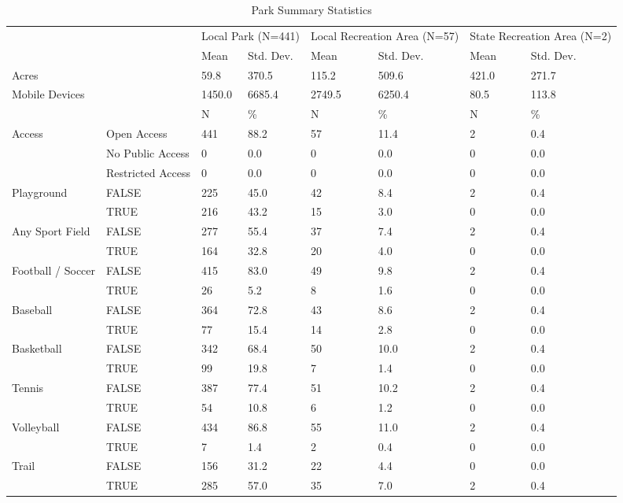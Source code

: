 \documentclass[]{elsarticle} %
\begin{document}
\begin{table}

\caption{\label{tab:park-attributes}Park Summary Statistics}
\centering
\begin{tabular}[t]{llllllll}
\toprule
\multicolumn{2}{c}{ } & \multicolumn{2}{c}{Local Park (N=441)} & \multicolumn{2}{c}{Local Recreation Area (N=57)} & \multicolumn{2}{c}{State Recreation Area (N=2)} \\
\cmidrule(l{3pt}r{3pt}){3-4} \cmidrule(l{3pt}r{3pt}){5-6} \cmidrule(l{3pt}r{3pt}){7-8}
  &    & Mean & Std. Dev. & Mean  & Std. Dev.  & Mean   & Std. Dev.  \\
\midrule
Acres &  & 59.8 & 370.5 & 115.2 & 509.6 & 421.0 & 271.7\\
Mobile Devices &  & 1450.0 & 6685.4 & 2749.5 & 6250.4 & 80.5 & 113.8\\
\midrule
 &  & N & \% & N & \% & N & \%\\
Access & Open Access & 441 & 88.2 & 57 & 11.4 & 2 & 0.4\\
 & No Public Access & 0 & 0.0 & 0 & 0.0 & 0 & 0.0\\
 & Restricted Access & 0 & 0.0 & 0 & 0.0 & 0 & 0.0\\
Playground & FALSE & 225 & 45.0 & 42 & 8.4 & 2 & 0.4\\
 & TRUE & 216 & 43.2 & 15 & 3.0 & 0 & 0.0\\
Any Sport Field & FALSE & 277 & 55.4 & 37 & 7.4 & 2 & 0.4\\
 & TRUE & 164 & 32.8 & 20 & 4.0 & 0 & 0.0\\
Football / Soccer & FALSE & 415 & 83.0 & 49 & 9.8 & 2 & 0.4\\
 & TRUE & 26 & 5.2 & 8 & 1.6 & 0 & 0.0\\
Baseball & FALSE & 364 & 72.8 & 43 & 8.6 & 2 & 0.4\\
 & TRUE & 77 & 15.4 & 14 & 2.8 & 0 & 0.0\\
Basketball & FALSE & 342 & 68.4 & 50 & 10.0 & 2 & 0.4\\
 & TRUE & 99 & 19.8 & 7 & 1.4 & 0 & 0.0\\
Tennis & FALSE & 387 & 77.4 & 51 & 10.2 & 2 & 0.4\\
 & TRUE & 54 & 10.8 & 6 & 1.2 & 0 & 0.0\\
Volleyball & FALSE & 434 & 86.8 & 55 & 11.0 & 2 & 0.4\\
 & TRUE & 7 & 1.4 & 2 & 0.4 & 0 & 0.0\\
Trail & FALSE & 156 & 31.2 & 22 & 4.4 & 0 & 0.0\\
 & TRUE & 285 & 57.0 & 35 & 7.0 & 2 & 0.4\\
\bottomrule
\end{tabular}
\end{table}
\end{document}
